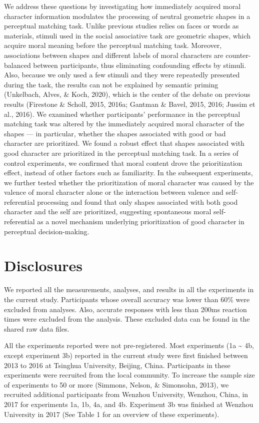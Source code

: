 \documentclass[
  man]{apa6}
\begin{document}
We address these questions by investigating how immediately acquired moral character information modulates the processing of neutral geometric shapes in a perceptual matching task. Unlike previous studies relies on faces or words as materials, stimuli used in the social associative task are geometric shapes, which acquire moral meaning before the perceptual matching task. Moreover, associations between shapes and different labels of moral characters are counter-balanced between participants, thus eliminating confounding effects by stimuli. Also, because we only used a few stimuli and they were repeatedly presented during the task, the results can not be explained by semantic priming (Unkelbach, Alves, \& Koch, 2020), which is the center of the debate on previous results (Firestone \& Scholl, 2015, 2016a; Gantman \& Bavel, 2015, 2016; Jussim et al., 2016). We examined whether participants' performance in the perceptual matching task was altered by the immediately acquired moral character of the shapes --- in particular, whether the shapes associated with good or bad character are prioritized. We found a robust effect that shapes associated with good character are prioritized in the perceptual matching task. In a series of control experiments, we confirmed that moral content drove the prioritization effect, instead of other factors such as familiarity. In the subsequent experiments, we further tested whether the prioritization of moral character was caused by the valence of moral character alone or the interaction between valence and self-referential processing and found that only shapes associated with both good character and the self are prioritized, suggesting spontaneous moral self-referential as a novel mechanism underlying prioritization of good character in perceptual decision-making.

\hypertarget{disclosures}{%
\section{Disclosures}\label{disclosures}}

We reported all the measurements, analyses, and results in all the experiments in the current study. Participants whose overall accuracy was lower than 60\% were excluded from analyses. Also, accurate responses with less than 200ms reaction times were excluded from the analysis. These excluded data can be found in the shared raw data files.

All the experiments reported were not pre-registered. Most experiments (1a \textasciitilde{} 4b, except experiment 3b) reported in the current study were first finished between 2013 to 2016 at Tsinghua University, Beijing, China. Participants in these experiments were recruited from the local community. To increase the sample size of experiments to 50 or more (Simmons, Nelson, \& Simonsohn, 2013), we recruited additional participants from Wenzhou University, Wenzhou, China, in 2017 for experiments 1a, 1b, 4a, and 4b. Experiment 3b was finished at Wenzhou University in 2017 (See Table 1 for an overview of these experiments).
\end{document}
